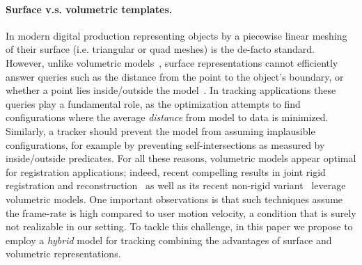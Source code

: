 \paragraph{Surface v.s. volumetric templates.}
In modern digital production representing objects by a piecewise linear meshing of their surface (i.e. triangular or quad meshes) is the de-facto standard. However, unlike volumetric models~\cite{bloomenthal1997book}, surface representations cannot efficiently answer queries such as the distance from the point to the object's boundary, or whether a point lies inside/outside the model~\cite[Ch.1]{botsch2010book}. In tracking applications these queries play a fundamental role, as the optimization attempts to find configurations where the average \emph{distance} from model to data is minimized. Similarly, a tracker should prevent the model from assuming implausible configurations, for example by preventing self-intersections as measured by inside/outside predicates. For all these reasons, volumetric models appear optimal for registration applications; indeed, recent compelling results in joint rigid registration and reconstruction~\cite{newcombe2011kinfu} as well as its recent non-rigid variant~\cite{newcombe2015dynfusion} leverage volumetric models. One important observations is that such techniques assume the frame-rate is high compared to user motion velocity, a condition that is surely not realizable in our setting.  To tackle this challenge, in this paper we propose to employ a \emph{hybrid} model for tracking combining the advantages of surface and volumetric representations.


